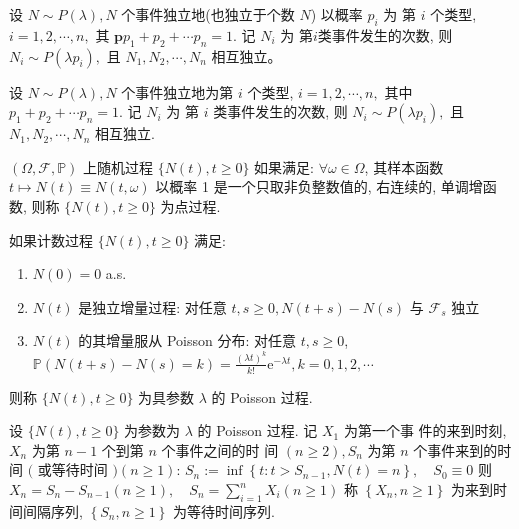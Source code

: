 \documentclass[10pt]{yerbaformat}
\begin{document}
\begin{theorem}
    设 $N \sim P(\lambda), N$ 个事件独立地(也独立于个数 $N$) 以概率 $p_{i}$ 为 第 $i$ 个类型, $i=1,2, \cdots, n,$ 其 $\mathbf{p} p_{1}+p_{2}+\cdots p_{n}=1 .$ 记 $N_{i}$ 为 第$i$类事件发生的次数, 则 $N_{i} \sim P\left(\lambda p_{i}\right),$ 且 $N_{1}, N_{2}, \cdots, N_{n}$ 相互独立。
\end{theorem}

\begin{theorem}
    设 $N \sim P(\lambda), N$ 个事件独立地为第 $i$ 个类型, $i=1,2, \cdots, n,$ 其中 $p_{1}+p_{2}+\cdots p_{n}=1 .$ 记 $N_{i}$ 为 第 $i$ 类事件发生的次数, 则 $N_{i} \sim P\left(\lambda p_{i}\right),$ 且 $N_{1}, N_{2}, \cdots, N_{n}$ 相互独立.
\end{theorem}

\begin{definition}[点过程]
    $(\Omega, \mathcal{F}, \mathbb{P})$ 上随机过程 $\{N(t), t \geq 0\}$ 如果满足:
    $\forall \omega \in \Omega$, 其样本函数 $t \mapsto N(t) \equiv N(t, \omega)$
    以概率 1 是一个只取非负整数值的, 右连续的, 单调增函数, 则称 $\{N(t), t \geq 0\}$ 为点过程.
\end{definition}

\begin{definition}
    如果计数过程 $\{N(t), t \geq 0\}$ 满足:
    \begin{enumerate}
        \item $N(0)=0$ a.s.
        \item $N(t)$ 是独立增量过程: 对任意 $t, s \geq 0, N(t+s)-N(s)$ 与 $\mathcal{F}_{s}$ 独立
        \item $N(t)$ 的其增量服从 Poisson 分布: 对任意 $t, s \geq 0$, $\mathbb{P}(N(t+s)-N(s)=k)=\frac{(\lambda t)^{k}}{k !} \mathrm{e}^{-\lambda t}, k=0,1,2, \cdots$
    \end{enumerate}
    则称 $\{N(t), t \geq 0\}$ 为具参数 $\lambda$ 的 Poisson 过程.
\end{definition}

\begin{definition}
    设 $\{N(t), t \geq 0\}$ 为参数为 $\lambda$ 的 Poisson 过程. 记 $X_{1}$ 为第一个事 件的来到时刻, $X_{n}$ 为第 $n-1$ 个到第 $n$ 个事件之间的时 间 $(n \geq 2), S_{n}$ 为第 $n$ 个事件来到的时间 $($ 或等待时间 $)(n \geq 1)$: $S_{n}:=\inf \left\{t: t>S_{n-1}, N(t)=n\right\}, \quad S_{0} \equiv 0$ 则 $X_{n}=S_{n}-S_{n-1}(n \geq 1), \quad S_{n}=\sum_{i=1}^{n} X_{i}(n \geq 1)$ 称 $\left\{X_{n}, n \geq 1\right\}$ 为来到时间间隔序列, $\left\{S_{n}, n \geq 1\right\}$ 为等待时间序列.
\end{definition}
\end{document}
